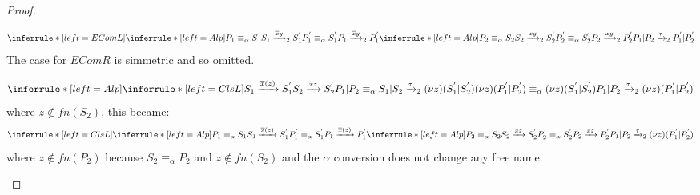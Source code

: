 \begin{theorem}
\begin{proof}
\begin{description}
\begin{description}
	    \[
	      \inferrule* [left=EComL]{
		  \inferrule* [left=Alp]{
		      P_{1}\equiv_{\alpha}S_{1}
		    \\
		      S_{1}\xrightarrow{\overline{x}y}_{2}S_{1}^{'}
		    \\
		      P_{1}^{'}\equiv_{\alpha}S_{1}^{'}
		  }{
		    P_{1}\xrightarrow{\overline{x}y}_{2}P_{1}^{'}
		  }
		\\
		  \inferrule* [left=Alp]{
		      P_{2}\equiv_{\alpha}S_{2}
		    \\
		      S_{2}\xrightarrow{xy}_{2}S_{2}^{'}
		    \\
		      P_{2}^{'}\equiv_{\alpha}S_{2}^{'}
		  }{
		    P_{2} \xrightarrow{xy}_{2} P_{2}^{'}
		  }
	      }{
		P_{1}|P_{2} \xrightarrow{\tau}_{2} P_{1}^{'}|P_{2}^{'}
	      }
	    \]
	    The case for $EComR$ is simmetric and so omitted.
	  \item[ClsL]
	    \[
	      \inferrule* [left=Alp]{
		  \inferrule* [left=ClsL]{
		      S_{1} \xrightarrow{\overline{x}(z)} S_{1}^{'}
		    \\
		      S_{2} \xrightarrow{xz} S_{2}^{'}
		  }{
		   P_{1}|P_{2}\equiv_{\alpha} S_{1}|S_{2} \xrightarrow{\tau}_{2} (\nu z)(S_{1}^{'}|S_{2}^{'})
		  }
		\\
		  (\nu z)(P_{1}^{'}|P_{2}^{'})\equiv_{\alpha}(\nu z)(S_{1}^{'}|S_{2}^{'})
	      }{
		P_{1}|P_{2} \xrightarrow{\tau}_{2} (\nu z)(P_{1}^{'}|P_{2}^{'})
	      }
	    \]
	    where $z\notin fn(S_{2})$, this became:
	    \[
	      \inferrule* [left=ClsL]{
		  \inferrule* [left=Alp]{
		      P_{1}\equiv_{\alpha}S_{1}
		    \\
		      S_{1} \xrightarrow{\overline{x}(z)} S_{1}^{'}
		    \\
		      P_{1}^{'}\equiv_{\alpha}S_{1}^{'}
		  }{
		    P_{1} \xrightarrow{\overline{x}(z)} P_{1}^{'}
		  }
		\\
		  \inferrule* [left=Alp]{
		      P_{2}\equiv_{\alpha}S_{2}
		    \\
		      S_{2} \xrightarrow{xz} S_{2}^{'}
		    \\
		      P_{2}^{'}\equiv_{\alpha}S_{2}^{'}
		  }{
		      P_{2} \xrightarrow{xz} P_{2}^{'}
		  }
	      }{
		P_{1}|P_{2} \xrightarrow{\tau}_{2} (\nu z)(P_{1}^{'}|P_{2}^{'})
	      }
	    \]
	    where $z\notin fn(P_{2})$ because $S_{2}\equiv_{\alpha}P_{2}$ and $z\notin fn(S_{2})$ and the $\alpha$ conversion does not change any free name.
	  \item[Cns]

\end{description}
\end{description}
\end{proof}
\end{theorem}

